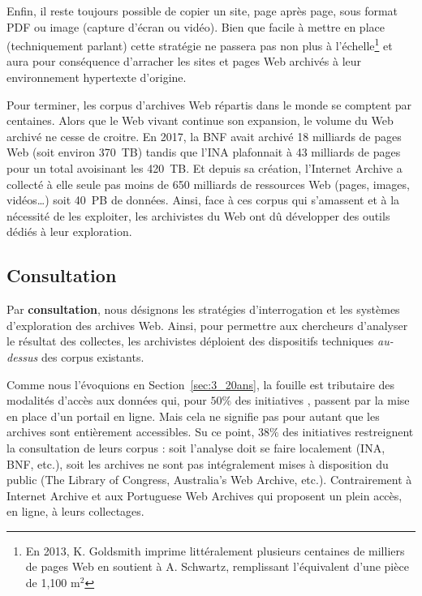 \documentclass[symmetric,justified,marginals=raggedouter]{tufte-book}
\begin{document}
Enfin, il reste toujours possible de copier un site, page après page, sous format PDF ou image (capture d'écran ou vidéo). Bien que facile à mettre en place (techniquement parlant) cette stratégie ne passera pas non plus à l'échelle\footnote{\RaggedOuter En 2013, K. Goldsmith imprime littéralement plusieurs centaines de milliers de pages Web en soutient à A. Schwartz, remplissant l'équivalent d'une pièce de 1,100 $\mathrm{m}^2$} et aura pour conséquence d'arracher les sites et pages Web archivés à leur environnement hypertexte d'origine.  

Pour terminer, les corpus d'archives Web répartis dans le monde se comptent par centaines. Alors que le Web vivant continue son expansion, le volume du Web archivé ne cesse de croitre. En 2017, la BNF avait archivé 18 milliards de pages Web (soit environ 370~TB) tandis que l'INA plafonnait à 43 milliards de pages pour un total avoisinant les 420~TB. Et depuis sa création, l'Internet Archive a collecté à elle seule pas moins de 650 milliards de ressources Web (pages, images, vidéos\ldots{}) soit 40~PB de données. Ainsi, face à ces corpus qui s'amassent et à la nécessité de les exploiter, les archivistes du Web ont dû développer des outils dédiés à leur exploration.

\subsection{Consultation}

\noindent Par \textbf{consultation}, nous désignons les stratégies d'interrogation et les systèmes d'exploration des archives Web. Ainsi, pour permettre aux chercheurs d'ana\-lyser le résultat des collectes, les archivistes déploient des dispositifs techniques \textit{au-dessus} des corpus existants. 

Comme nous l'évoquions en Section~\ref{sec:3_20ans}, la fouille est tributaire des modalités d'accès aux données qui, pour $50\%$ des initiatives \citep{costa_survey_2013}, passent par la mise en place d'un portail en ligne. Mais cela ne signifie pas pour autant que les archives sont entièrement accessibles. Su ce point, $38\%$ des initiatives restreignent la consultation de leurs corpus : soit l'analyse doit se faire localement (INA, BNF, etc.), soit les archives ne sont pas intégralement mises à disposition du public (The Library of Congress, Australia's Web Archive, etc.). Contrairement à Internet Archive et aux Portuguese Web Archives qui proposent un plein accès, en ligne, à leurs collectages.  
\end{document}
